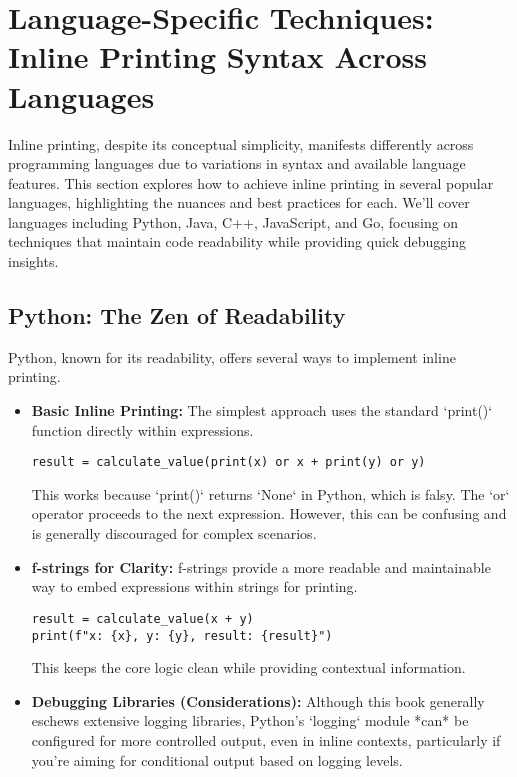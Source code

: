 \documentclass{article}
\begin{document}
{{{{\section*{Language-Specific Techniques: Inline Printing Syntax Across Languages}

Inline printing, despite its conceptual simplicity, manifests differently across programming languages due to variations in syntax and available language features. This section explores how to achieve inline printing in several popular languages, highlighting the nuances and best practices for each. We'll cover languages including Python, Java, C++, JavaScript, and Go, focusing on techniques that maintain code readability while providing quick debugging insights.

\subsection*{Python: The Zen of Readability}

Python, known for its readability, offers several ways to implement inline printing.

\begin{itemize}
    \item \textbf{Basic Inline Printing:} The simplest approach uses the standard `print()` function directly within expressions.

\begin{verbatim}
result = calculate_value(print(x) or x + print(y) or y)
\end{verbatim}

        This works because `print()` returns `None` in Python, which is falsy. The `or` operator proceeds to the next expression. However, this can be confusing and is generally discouraged for complex scenarios.

    \item \textbf{f-strings for Clarity:}  f-strings provide a more readable and maintainable way to embed expressions within strings for printing.

\begin{verbatim}
result = calculate_value(x + y)
print(f"x: {x}, y: {y}, result: {result}")
\end{verbatim}

        This keeps the core logic clean while providing contextual information.

    \item \textbf{Debugging Libraries (Considerations):} Although this book generally eschews extensive logging libraries, Python's `logging` module *can* be configured for more controlled output, even in inline contexts, particularly if you're aiming for conditional output based on logging levels.


\end{itemize}}}}}
\end{document}

